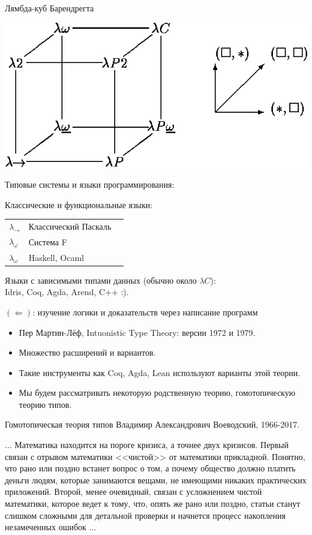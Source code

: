 \documentclass[aspectratio=169]{beamer}
\begin{document}
\begin{frame}{Лямбда-куб Барендрегта}
\begin{center}
    {\includegraphics[scale=0.3]{lection-00-cube.png}}
\end{center}
Типовые системы и языки программирования:

Классические и функциональные языки:

\begin{tabular}{lll}
$\lambda_\rightarrow$          & Классический Паскаль\\
$\lambda_{\underline{\omega}}$ & Система F\\
$\lambda_\omega$& Haskell, Ocaml
\end{tabular}

\vspace{0.3cm}
Языки с зависимыми типами данных (обычно около $\lambda C$):\\
Idris, Coq, Agda, Arend, C++ :).
\end{frame}

\begin{frame}{$(\Leftarrow)$: изучение логики и доказательств через написание программ}
\begin{itemize}
\item Пер Мартин-Лёф, Intuonistic Type Theory: версии 1972 и 1979.
\item Множество расширений и вариантов.
\item Такие инструменты как Coq, Agda, Lean используют варианты этой теории.
\item Мы будем рассматривать некоторую родственную теорию, гомотопическую теорию типов.
\end{itemize}
\end{frame}


\begin{frame}[fragile]{Гомотопическая теория типов}
Владимир Александрович Воеводский, 1966-2017. \vspace{0.5cm}

... Математика находится на пороге кризиса, а точнее двух кризисов. Первый связан с отрывом 
математики <<чистой>> от математики прикладной. Понятно, что рано или поздно встанет вопрос о 
том, а почему общество должно платить деньги людям, которые занимаются вещами, не имеющими 
никаких практических приложений. Второй, менее очевидный, связан с усложнением чистой математики, 
которое ведет к тому, что, опять же рано или поздно, статьи станут слишком сложными для детальной 
проверки и начнется процесс накопления незамеченных ошибок ...

\end{frame}
\end{document}
